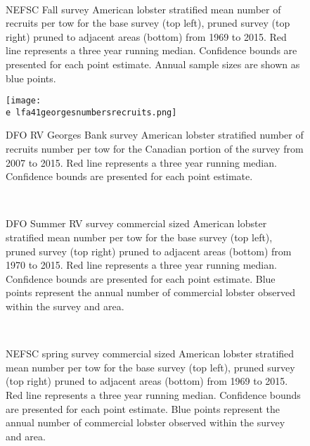 \documentclass[11pt]{article}
\newcommand{\e}{/backup/bio_data/bio.lobster/figures/} %
\begin{document}
\begin{figure}
\centering
{}
\\

\caption{NEFSC Fall survey American lobster stratified mean number of recruits per tow for the base survey (top left), pruned survey (top right) pruned to adjacent areas (bottom) from 1969 to 2015. Red line represents a three year running median. Confidence bounds are presented for each point estimate. Annual sample sizes are shown as blue points. }
\end{figure}
\clearpage


\begin{figure}

    \texttt{[image: \\e lfa41georgesnumbersrecruits.png]}
    \caption{DFO RV Georges Bank survey American lobster stratified number of recruits number per tow for the Canadian portion of the survey from 2007 to 2015. Red line represents a three year running median. Confidence bounds are presented for each point estimate.}

\end{figure}



\begin{figure}
\centering
{}
\\
\caption{DFO Summer RV survey commercial sized American lobster stratified mean number per tow for the base survey (top left), pruned survey (top right) pruned to adjacent areas (bottom) from 1970 to 2015. Red line represents a three year running median. Confidence bounds are presented for each point estimate. Blue points represent the annual number of commercial lobster observed within the survey and area.}
\end{figure}
\clearpage

\begin{figure}
\centering
{}
\\
\caption{NEFSC spring survey commercial sized American lobster stratified mean number per tow for the base survey (top left), pruned survey (top right) pruned to adjacent areas (bottom) from 1969 to 2015. Red line represents a three year running median. Confidence bounds are presented for each point estimate. Blue points represent the annual number of commercial lobster observed within the survey and area.}
\end{figure}
\clearpage
\end{document}
